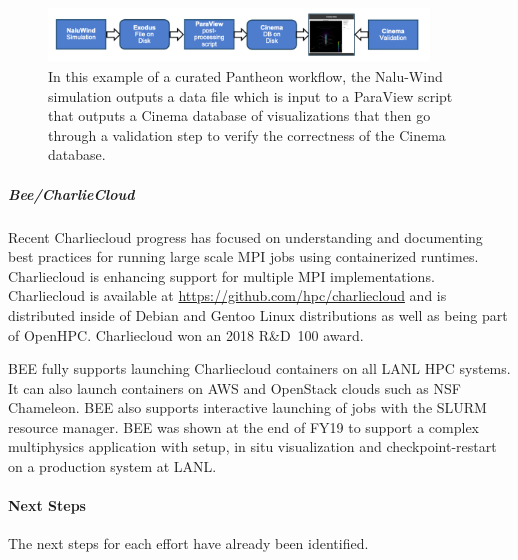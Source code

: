 \begin{figure}[htb]
	\centering
	\includegraphics[width=0.9\textwidth]{projects/2.3.6-NNSA/2.3.6.01-LANL-ATDM/pantheon-workflow.png}
	\caption{
		In this example of a curated Pantheon workflow, the Nalu-Wind simulation outputs a data file which is input to a ParaView script that outputs a Cinema database of visualizations that then go through a validation step to verify the correctness of the Cinema database.  
		\label{fig:cinema-pantheon}
	}
\end{figure}


\subparagraph{Bee/CharlieCloud}
%
Recent Charliecloud progress has focused on understanding and documenting best
practices for running large scale MPI jobs using containerized runtimes.
Charliecloud is enhancing support for multiple MPI implementations.
Charliecloud is available at \url{https://github.com/hpc/charliecloud} and is
distributed inside of Debian and Gentoo Linux distributions as well as being
part of OpenHPC.  Charliecloud won an 2018 R\&D~100 award.

BEE fully supports launching Charliecloud containers on all LANL HPC systems.
It can also launch containers on AWS and OpenStack clouds such as NSF
Chameleon.  BEE also supports interactive launching of jobs with the SLURM
resource manager. BEE was shown at the end of FY19 to support a complex multiphysics application with setup, in situ visualization and checkpoint-restart on a production system at LANL.

\paragraph{Next Steps} %
The next steps for each effort have already been identified.

